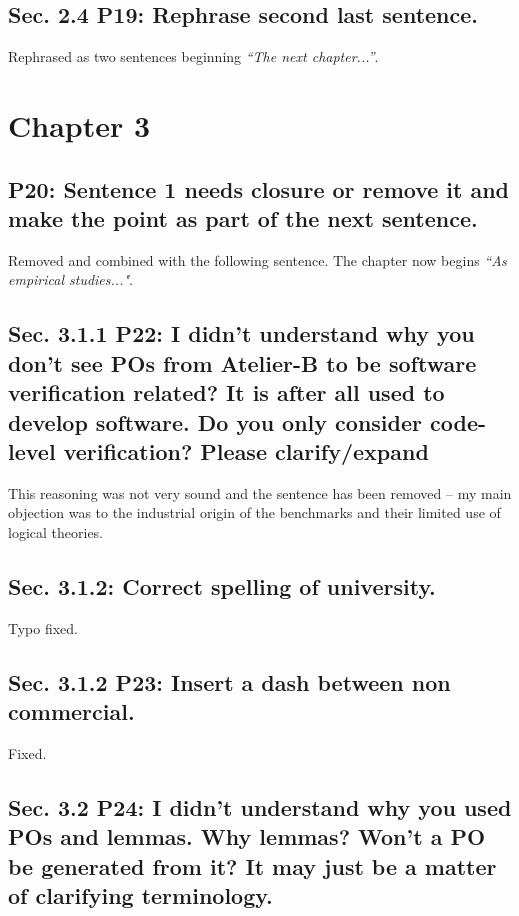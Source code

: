 \documentclass[]{article}
\begin{document}
\subsection{Sec. 2.4 P19: Rephrase second last sentence.}

Rephrased as two sentences beginning \emph{``The next chapter...''}.

\section{Chapter 3}

\subsection{P20: Sentence 1 needs closure or remove it and make the point as part of the next sentence.}

Removed and combined with the following sentence. The chapter now begins \emph{``As empirical studies..."}.

\subsection{Sec. 3.1.1 P22: I didn't understand why you don't see POs from Atelier-B to be software verification related? It is after all used to develop software. Do you only consider code-level verification? Please clarify/expand}

This reasoning was not very sound and the sentence has been removed -- my main objection was to the industrial origin of the benchmarks and their limited use of logical theories.

\subsection{Sec. 3.1.2: Correct spelling of university.}

Typo fixed.

\subsection{Sec. 3.1.2 P23: Insert a dash between non commercial.}

Fixed.

\subsection{Sec. 3.2 P24: I didn't understand why you used POs and lemmas. Why lemmas? Won't a PO be generated from it? It may just be a matter of clarifying terminology.}
\end{document}
